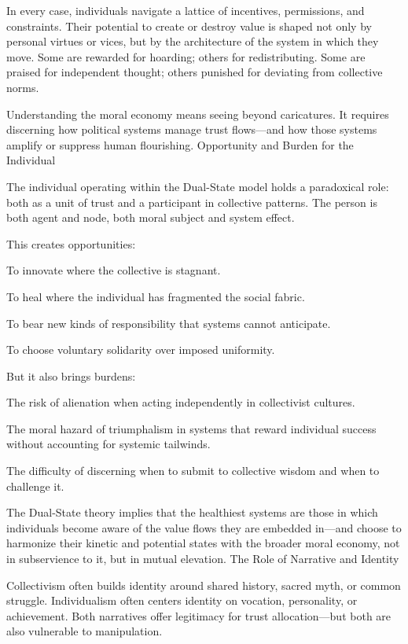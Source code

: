 \documentclass[11pt,oneside]{book}
\begin{document}
In every case, individuals navigate a lattice of incentives, permissions, and constraints. Their potential to create or destroy value is shaped not only by personal virtues or vices, but by the architecture of the system in which they move. Some are rewarded for hoarding; others for redistributing. Some are praised for independent thought; others punished for deviating from collective norms.

Understanding the moral economy means seeing beyond caricatures. It requires discerning how political systems manage trust flows—and how those systems amplify or suppress human flourishing.
Opportunity and Burden for the Individual

The individual operating within the Dual-State model holds a paradoxical role: both as a unit of trust and a participant in collective patterns. The person is both agent and node, both moral subject and system effect.

This creates opportunities:

    To innovate where the collective is stagnant.

    To heal where the individual has fragmented the social fabric.

    To bear new kinds of responsibility that systems cannot anticipate.

    To choose voluntary solidarity over imposed uniformity.

But it also brings burdens:

    The risk of alienation when acting independently in collectivist cultures.

    The moral hazard of triumphalism in systems that reward individual success without accounting for systemic tailwinds.

    The difficulty of discerning when to submit to collective wisdom and when to challenge it.

The Dual-State theory implies that the healthiest systems are those in which individuals become aware of the value flows they are embedded in—and choose to harmonize their kinetic and potential states with the broader moral economy, not in subservience to it, but in mutual elevation.
The Role of Narrative and Identity

Collectivism often builds identity around shared history, sacred myth, or common struggle. Individualism often centers identity on vocation, personality, or achievement. Both narratives offer legitimacy for trust allocation—but both are also vulnerable to manipulation.
\end{document}
